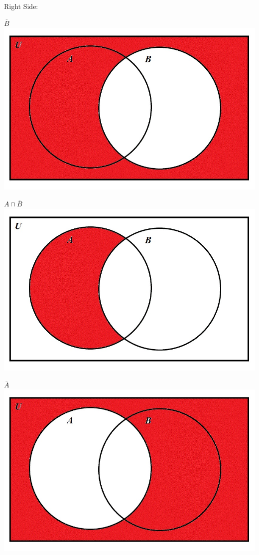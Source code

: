 \documentclass[10pt]{article}
\begin{document}
Right Side:

$\overline{B}$\\
\includegraphics[scale=0.3]{5}

$A \cap \overline{B}$\\
\includegraphics[scale=0.3]{6}

$\overline{A}$\\
\includegraphics[scale=0.3]{7}
\end{document}
